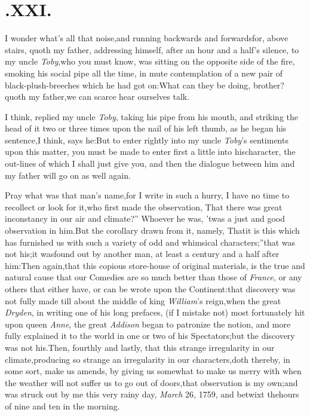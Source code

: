 \documentclass{article}
\begin{document}
\section{.\enspace XXI.}

\quad\tsh I wonder what’s
all that noise,\break and running backwards and forwards\break for, above
stairs, quoth my father, addressing himself, after an hour and a\break
half’s silence, to my uncle \textit{Toby},\tsh who
you must know, was sitting on the opposite side of the fire,
smoking his social pipe all the time, in mute contemplation of a
new pair of black-plush-breeches\break
which he had got on:\tsk What
can they be doing, brother? quoth my father,\tsk\break we can
scarce hear ourselves talk.

I think, replied my uncle \textit{Toby}, taking his pipe from his
mouth, and striking the head of it two or three times upon the nail
of his left thumb, as he began his sentence,\tsh I think,
says he:\tsh\break But to enter rightly into my uncle
\textit{Toby}’s sentiments upon this matter, you must be made
to enter first a little into his\break character, the out-lines of which
I shall just give you, and then the dialogue between
him and my father will go on as well again.

\tsk Pray what was that man’s name,\tsk\break for I write in such a
hurry, I have no time to recollect or look for it,\tsh who
first made the observation, \lqq That there was great
inconstancy in our air and climate?” Whoever he was,
’twas a just and good observation in him.\tsk But the
corollary drawn from it, namely, \lqq That\break it is this which
has furnished us with such a variety of odd and whimsical
characters;”\tsk that was not his;\tsk it was\break found out
by another man, at least a century and a half after him:\tsk Then\break
again,\tsk that this copious store-house of original materials,
is the true and natural cause that our Comedies are so much better
than those of \textit{France}, or any others that either have, or can
be wrote upon the Continent:\tsh that discovery was not
fully made till about the middle of king \textit{William}’s
reign,\tsk when the great \textit{Dryden}, in writing one of his
long prefaces, (if I mistake not) most fortunately hit upon\break
{}
queen \textit{Anne}, the great \textit{Addison} began to
patronize the notion, and more fully explained it to the world in
one or two of his Spectators;\tsk but the discovery was not
his.\tsk Then, fourthly and lastly, that this strange
irregularity in our climate,\break producing so strange an irregularity
in our characters,\tsh doth thereby, in some sort, make us
amends, by giving us somewhat to make us merry with when the
weather will not suffer us to go out of doors,\tsk that
observation is my own;\tsk\break and was struck out by me this very
rainy day, \textit{March} 26, 1759, and betwixt the\break hours of nine and
ten in the morning.
\end{document}
